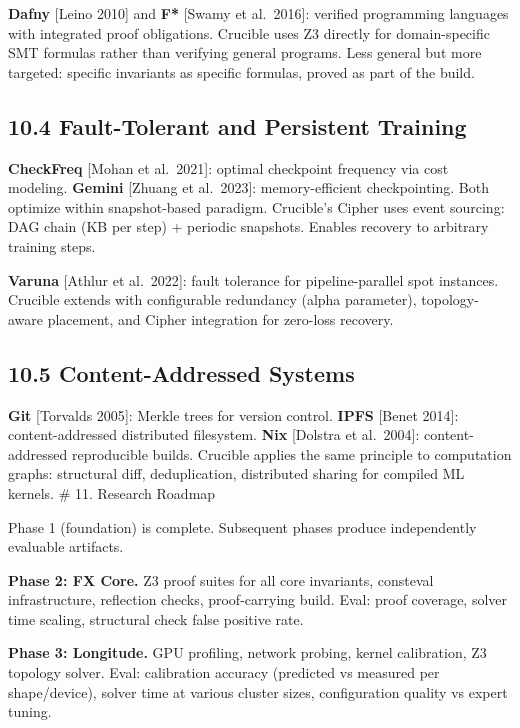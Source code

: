 \textbf{Dafny} {[}Leino 2010{]} and \textbf{F*} {[}Swamy et al.~2016{]}: verified programming languages with integrated proof obligations. Crucible uses Z3 directly for domain-specific SMT formulas rather than verifying general programs. Less general but more targeted: specific invariants as specific formulas, proved as part of the build.

\subsection{10.4 Fault-Tolerant and Persistent Training}\label{fault-tolerant-and-persistent-training}

\textbf{CheckFreq} {[}Mohan et al.~2021{]}: optimal checkpoint frequency via cost modeling. \textbf{Gemini} {[}Zhuang et al.~2023{]}: memory-efficient checkpointing. Both optimize within snapshot-based paradigm. Crucible's Cipher uses event sourcing: DAG chain (KB per step) + periodic snapshots. Enables recovery to arbitrary training steps.

\textbf{Varuna} {[}Athlur et al.~2022{]}: fault tolerance for pipeline-parallel spot instances. Crucible extends with configurable redundancy (alpha parameter), topology-aware placement, and Cipher integration for zero-loss recovery.

\subsection{10.5 Content-Addressed Systems}\label{content-addressed-systems}

\textbf{Git} {[}Torvalds 2005{]}: Merkle trees for version control. \textbf{IPFS} {[}Benet 2014{]}: content-addressed distributed filesystem. \textbf{Nix} {[}Dolstra et al.~2004{]}: content-addressed reproducible builds. Crucible applies the same principle to computation graphs: structural diff, deduplication, distributed sharing for compiled ML kernels.
\# 11. Research Roadmap

Phase 1 (foundation) is complete. Subsequent phases produce independently evaluable artifacts.

\textbf{Phase 2: FX Core.} Z3 proof suites for all core invariants, consteval infrastructure, reflection checks, proof-carrying build. Eval: proof coverage, solver time scaling, structural check false positive rate.

\textbf{Phase 3: Longitude.} GPU profiling, network probing, kernel calibration, Z3 topology solver. Eval: calibration accuracy (predicted vs measured per shape/device), solver time at various cluster sizes, configuration quality vs expert tuning.

